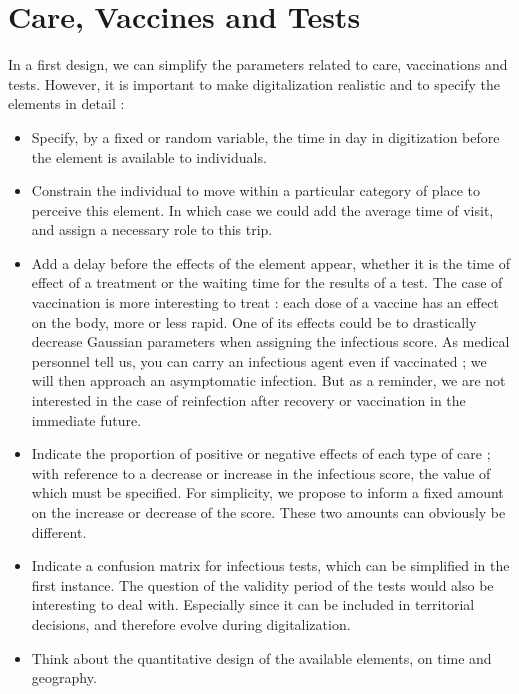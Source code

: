 \section{Care, Vaccines and Tests}

In a first design, we can simplify the parameters related to care, vaccinations and tests. However, it is important to make digitalization realistic and to specify the elements in detail :\\

\begin{itemize}
\item Specify, by a fixed or random variable, the time in day in digitization before the element is available to individuals.
\item Constrain the individual to move within a particular category of place to perceive this element. In which case we could add the average time of visit, and assign a necessary role to this trip.
\item Add a delay before the effects of the element appear, whether it is the time of effect of a treatment or the waiting time for the results of a test. The case of vaccination is more interesting to treat : each dose of a vaccine has an effect on the body, more or less rapid. One of its effects could be to drastically decrease Gaussian parameters when assigning the infectious score. As medical personnel tell us, you can carry an infectious agent even if vaccinated ; we will then approach an asymptomatic infection. But as a reminder, we are not interested in the case of reinfection after recovery or vaccination in the immediate future.
\item Indicate the proportion of positive or negative effects of each type of care ; with reference to a decrease or increase in the infectious score, the value of which must be specified. For simplicity, we propose to inform a fixed amount on the increase or decrease of the score. These two amounts can obviously be different.
\item Indicate a confusion matrix for infectious tests, which can be simplified in the first instance. The question of the validity period of the tests would also be interesting to deal with. Especially since it can be included in territorial decisions, and therefore evolve during digitalization.
\item Think about the quantitative design of the available elements, on time and geography.\\
\end{itemize}


